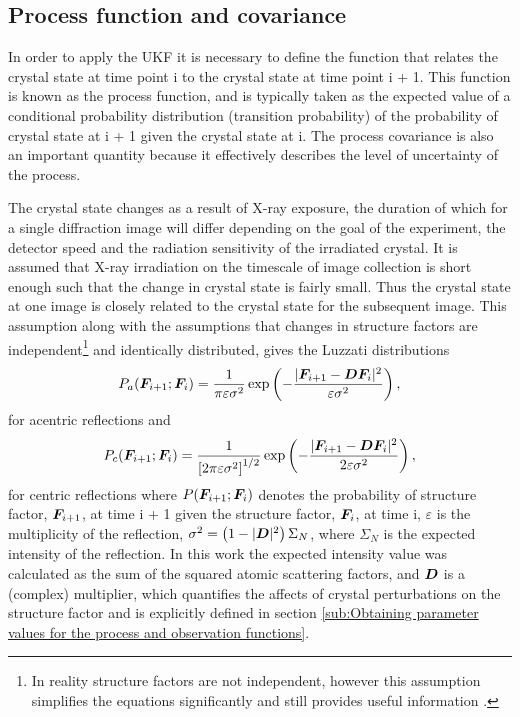 \subsection{Process function and covariance}
\label{sub:Process Function and covariance}
In order to apply the UKF it is necessary to define the function that relates the crystal state at time point i to the crystal state at time point i + 1.
This function is known as the process function, and is typically taken as the expected value of a conditional probability distribution (transition probability) of the probability of crystal state at i + 1 given the crystal state at i.
The process covariance is also an important quantity because it effectively describes the level of uncertainty of the process.

The crystal state changes as a result of X-ray exposure, the duration of which for a single diffraction image will differ depending on the goal of the experiment, the detector speed and the radiation sensitivity of the irradiated crystal.
It is assumed that X-ray irradiation on the timescale of image collection is short enough such that the change in crystal state is fairly small.
Thus the crystal state at one image is closely related to the crystal state for the subsequent image.
This assumption along with the assumptions that changes in structure factors are independent\footnote{In reality structure factors are not independent, however this assumption simplifies the equations significantly and still provides useful information \cite{pannu1996improved}.} and identically distributed, gives the Luzzati distributions \cite{luzzati1952traitement,read1990structure,pannu1996improved}
\begin{equation}
    P_a(\boldsymbol{F}_{i+1} ; \boldsymbol{F}_i) = \frac{1}{\pi \varepsilon \sigma^2} \exp \left(-\frac{|\boldsymbol{F}_{i+1} - \boldsymbol{D}\boldsymbol{F}_i|^2}{\varepsilon \sigma^2}\right),
    \label{eq:Luzzati distribution for acentric reflections}
\end{equation}
for acentric reflections and
\begin{equation}
    P_c(\boldsymbol{F}_{i+1} ; \boldsymbol{F}_i) = \frac{1}{\left[ 2 \pi \varepsilon \sigma^2 \right]^{1/2}} \exp \left(-\frac{|\boldsymbol{F}_{i+1} - \boldsymbol{D}\boldsymbol{F}_i|^2}{2 \varepsilon \sigma^2}\right),
    \label{eq:Luzzati distribution for centric reflections}
\end{equation}
for centric reflections where $P(\boldsymbol{F}_{i+1} ; \boldsymbol{F}_i)$ denotes the probability of structure factor, $\boldsymbol{F}_{i+1}$, at time i + 1 given the structure factor, $\boldsymbol{F}_{i}$, at time i, $\varepsilon$ is the multiplicity of the reflection, $\sigma^2 = \left(1 - |\boldsymbol{D}|^2 \right)\Sigma_N$, where $\Sigma_N$ is the expected intensity of the reflection.
In this work the expected intensity value was calculated as the sum of the squared atomic scattering factors, and $\boldsymbol{D}$ is a (complex) multiplier, which quantifies the affects of crystal perturbations on the structure factor and is  explicitly defined in section \ref{sub:Obtaining parameter values for the process and observation functions}.

